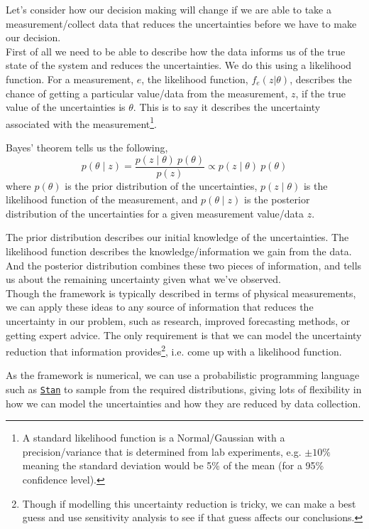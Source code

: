 Let's consider how our decision making will change if we are able to take a measurement/collect data that reduces the uncertainties before we have to make our decision.\\

First of all we need to be able to describe how the data informs us of the true state of the system and reduces the uncertainties. We do this using a likelihood function. For a measurement, $e$, the likelihood function, $f_e(z|\theta)$, describes the chance of getting a particular value/data from the measurement, $z$, if the true value of the uncertainties is $\theta$. This is to say it describes the uncertainty associated with the measurement\footnote{A standard likelihood function is a Normal/Gaussian with a precision/variance that is determined from lab experiments, e.g. $\pm10\%$ meaning the standard deviation would be 5\% of the mean (for a 95\% confidence level).}.

Bayes' theorem tells us the following,
\begin{equation}
    p(\theta \mid z) = \frac{p(z \mid \theta) \: p(\theta)}{p(z)} \propto p(z \mid \theta) \: p(\theta)
\end{equation}
where $p(\theta)$ is the prior distribution of the uncertainties, $p(z \mid \theta)$ is the likelihood function of the measurement, and $p(\theta \mid z)$ is the posterior distribution of the uncertainties for a given measurement value/data $z$.

The prior distribution describes our initial knowledge of the uncertainties. The likelihood function describes the knowledge/information we gain from the data. And the posterior distribution combines these two pieces of information, and tells us about the remaining uncertainty given what we've observed.\\

Though the framework is typically described in terms of physical measurements, we can apply these ideas to any source of information that reduces the uncertainty in our problem, such as research, improved forecasting methods, or getting expert advice. The only requirement is that we can model the uncertainty reduction that information provides\footnote{Though if modelling this uncertainty reduction is tricky, we can make a best guess and use sensitivity analysis to see if that guess affects our conclusions.}, i.e. come up with a likelihood function.

As the  framework is numerical, we can use a probabilistic programming language such as \href{https://mc-stan.org/}{\texttt{Stan}} \citep{carpenter2017StanProbabilisticProgramming} to sample from the required distributions, giving lots of flexibility in how we can model the uncertainties and how they are reduced by data collection.\\

